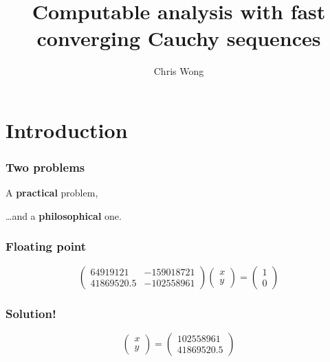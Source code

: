 \documentclass{beamer}
\begin{document}
\title{Computable analysis with fast converging Cauchy sequences}
\author{Chris Wong}

\frame{\titlepage}

\section{Introduction}
\begin{frame}
    \frametitle{Two problems}

    A \textbf{practical} problem,

    \vfill

    \hfill \ldots and a \textbf{philosophical} one.

\end{frame}

\begin{frame}
    \frametitle{Floating point}

    \[
        \begin{pmatrix}
            64919121 & -159018721 \\
            41869520.5 & -102558961
        \end{pmatrix}
        \begin{pmatrix}
            x \\ y
        \end{pmatrix}
        =
        \begin{pmatrix}
            1 \\ 0
        \end{pmatrix}
    \]

\end{frame}

\begin{frame}
    \frametitle{Solution!}

    \[
        \begin{pmatrix}
            x \\ y
        \end{pmatrix}
        =
        \begin{pmatrix}
            102558961 \\ 41869520.5
        \end{pmatrix}
    \]

\end{frame}
\end{document}
